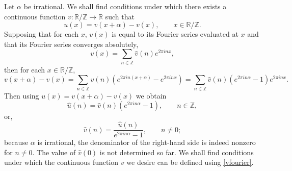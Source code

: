 \documentclass{article}
\theoremstyle{definition}
\begin{document}
Let $\alpha$ be irrational.
We shall find conditions under which there exists a continuous function $v:\mathbb{R} / \mathbb{Z} \to \mathbb{R}$ such that
\begin{equation}
u(x)=v(x+\alpha)-v(x), \qquad x \in \mathbb{R} / \mathbb{Z}.
\label{uvformula}
\end{equation}
Supposing that for each $x$, $v(x)$ is equal to its Fourier series evaluated at $x$ and that its Fourier series converges absolutely,
\[
v(x) = \sum_{n \in \mathbb{Z}} \widehat{v}(n) e^{2\pi i nx},
\]
then for each $x \in \mathbb{R} / \mathbb{Z}$,
\[
v(x+\alpha)-v(x) = \sum_{n \in \mathbb{Z}} \widehat{v}(n)\left( e^{2\pi in(x+\alpha)}-e^{2\pi i nx}\right)
= \sum_{n \in \mathbb{Z}} \widehat{v}(n)( e^{2\pi in\alpha}-1)e^{2\pi i nx}.
\]
Then using $u(x)=v(x+\alpha)-v(x)$ we obtain
\[
\widehat{u}(n) =  \widehat{v}(n)( e^{2\pi in\alpha}-1), \qquad n \in \mathbb{Z},
\]
or,
\begin{equation}
\widehat{v}(n) = \frac{\widehat{u}(n)}{e^{2\pi in\alpha}-1}, \qquad n \neq 0;
\label{vfourier}
\end{equation}
because $\alpha$ is irrational, the denominator of the right-hand side is indeed nonzero for $n \neq 0$. The value of $\widehat{v}(0)$
is not determined so far. 
We shall find conditions under which the continuous function $v$ we desire can be defined using \eqref{vfourier}.
\end{document}
